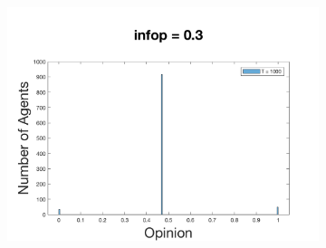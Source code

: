 \documentclass[11pt]{article}
\begin{document}
\begin{figure}[!htb]
\begin{subfigure}[!htb]{\textwidth}
  \includegraphics[width=\linewidth]{p_20/gen_plot_201712171361653386e+01.png}
\endminipage
\end{subfigure}


\end{figure}
\end{document}
